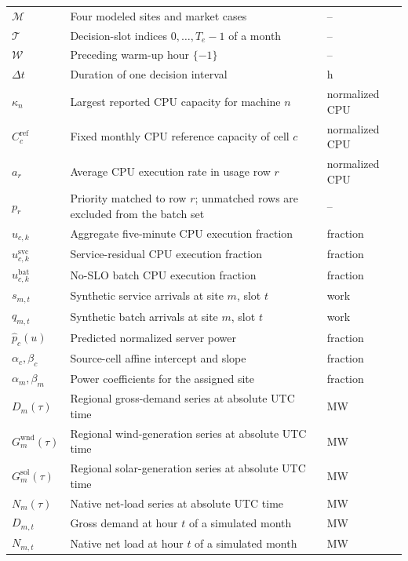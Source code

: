 \documentclass[conference]{IEEEtran}
\begin{document}
\begin{longtable}{@{}L{0.18\textwidth}L{0.56\textwidth}L{0.18\textwidth}@{}}
  \(\mathcal M\) & Four modeled sites and market cases & -- \\
  \(\mathcal T\) & Decision-slot indices \(0,\ldots,T_e-1\) of a month & -- \\
  \(\mathcal W\) & Preceding warm-up hour \(\{-1\}\) & -- \\
  \(\Delta t\) & Duration of one decision interval & h \\
  \(\kappa_n\) & Largest reported CPU capacity for machine \(n\) & normalized CPU \\
  \(C^{\mathrm{ref}}_c\) & Fixed monthly CPU reference capacity of cell \(c\) & normalized CPU \\
  \(a_r\) & Average CPU execution rate in usage row \(r\) & normalized CPU \\
  \(p_r\) & Priority matched to row \(r\); unmatched rows are excluded from the batch set & -- \\
  \(u_{c,k}\) & Aggregate five-minute CPU execution fraction & fraction \\
  \(u^{\mathrm{svc}}_{c,k}\) & Service-residual CPU execution fraction & fraction \\
  \(u^{\mathrm{bat}}_{c,k}\) & No-SLO batch CPU execution fraction & fraction \\
  \(s_{m,t}\) & Synthetic service arrivals at site \(m\), slot \(t\) & work \\
  \(q_{m,t}\) & Synthetic batch arrivals at site \(m\), slot \(t\) & work \\
  \(\widehat p_c(u)\) & Predicted normalized server power & fraction \\
  \(\alpha_c,\beta_c\) & Source-cell affine intercept and slope & fraction \\
  \(\alpha_m,\beta_m\) & Power coefficients for the assigned site & fraction \\
  \(D_m(\tau)\) & Regional gross-demand series at absolute UTC time & MW \\
  \(G^{\mathrm{wnd}}_m(\tau)\) & Regional wind-generation series at absolute UTC time & MW \\
  \(G^{\mathrm{sol}}_m(\tau)\) & Regional solar-generation series at absolute UTC time & MW \\
  \(N_m(\tau)\) & Native net-load series at absolute UTC time & MW \\
  \(D_{m,t}\) & Gross demand at hour \(t\) of a simulated month & MW \\
  \(N_{m,t}\) & Native net load at hour \(t\) of a simulated month & MW \\

\end{longtable}
\end{document}
